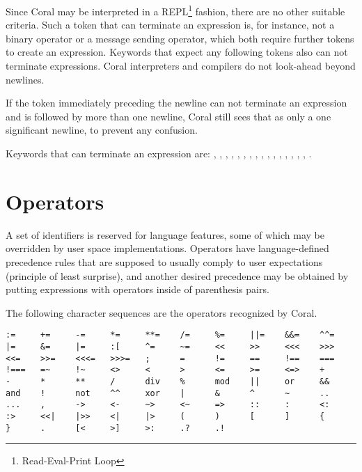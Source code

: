 Since Coral may be interpreted in a REPL\footnote{Read-Eval-Print Loop} fashion, there are no other suitable criteria. Such a token that can terminate an expression is, for instance, not a binary operator or a message sending operator, which both require further tokens to create an expression. Keywords that expect any following tokens also can not terminate expressions. Coral interpreters and compilers do not look-ahead beyond newlines.

If the token immediately preceding the newline can not terminate an expression and is followed by more than one newline, Coral still sees that as only a one significant newline, to prevent any confusion.

Keywords that can terminate an expression are: \lstinline@break@, \lstinline@end@, \lstinline@opaque@, \lstinline@native@, \lstinline@next@, \lstinline@nil@, \lstinline@no@, \lstinline@redo@, \lstinline@retry@, \lstinline@return@, \lstinline@self@, \lstinline@skip@, \lstinline@super@, \lstinline@this@, \lstinline@transparent@, \lstinline@yes@, \lstinline@yield@.

\section{Operators}\label{sec:operators}

A set of identifiers is reserved for language features, some of which may be overridden by user space implementations. Operators have language-defined precedence rules that are supposed to usually comply to user expectations (principle of least surprise), and another desired precedence may be obtained by putting expressions with operators inside of parenthesis pairs. 

The following character sequences are the operators recognized by Coral. 

\begin{lstlisting}
:=     +=     -=     *=     **=    /=     %=     ||=    &&=    ^^= 
|=     &=     |=     :[     ^=     ~=     <<     >>     <<<    >>> 
<<=    >>=    <<<=   >>>=   ;      =      !=     ==     !==    === 
!===   =~     !~     <>     <      >      <=     >=     <=>    + 
-      *      **     /      div    %      mod    ||     or     && 
and    !      not    ^^     xor    |      &      ^      ~      .. 
...    ,      ->     <-     ~>     <~     =>     ::     :      <: 
:>     <<|    |>>    <|     |>     (      )      [      ]      { 
}      .      [<     >]     >:     .?     .!
\end{lstlisting}

